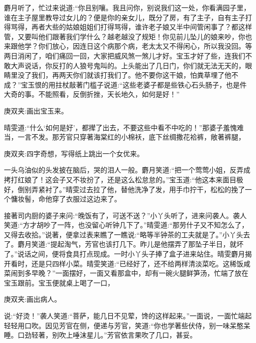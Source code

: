 \begin{parag}
麝月听了，忙过来说道:“你且别嚷。我且问你，别说我们这一处，你看满园子里，谁在主子屋里教导过女儿的？便是你的亲女儿，既分了房，有了主子，自有主子打得骂得，再者大些的姑娘姐姐们打得骂得，谁许老子娘又半中间管闲事了？都这样管，又要叫他们跟著我们学什么？越老越没了规矩！你见前儿坠儿的娘来吵，你也来跟他学？你们放心，因连日这个病那个病，老太太又不得闲心，所以我没回。等两日消闲了，咱们痛回一回，大家把威风煞一煞儿才好。宝玉才好了些，连我们不敢大声说话，你反打的人狼号鬼叫的。上头能出了几日门，你们就无法无天的，眼睛里没了我们，再两天你们就该打我们了。他不要你这干娘，怕粪草埋了他不成？”宝玉恨的用拄杖敲著门槛子说道:“这些老婆子都是些铁心石头肠子，也是件大奇的事。不能照看，反倒折挫，天长地久，如何是好！”\begin{note}庚双夹:画出宝玉来。\end{note}晴雯道:“什么‘如何是好’，都撵了出去，不要这些中看不中吃的！”那婆子羞愧难当，一言不发。那芳官只穿著海棠红的小棉袄，底下丝绸撒花袷裤，敞著裤腿，\begin{note}庚双夹:四字奇想，写得纸上跳出一个女优来。\end{note}一头乌油似的头发披在脑后，哭的泪人一般。麝月笑道:“把一个莺莺小姐，反弄成拷打红娘了！这会子又不妆扮了，还是这么松怠怠的。”宝玉道:“他这本来面目极好，倒别弄紧衬了。”晴雯过去拉了他，替他洗净了发，用手巾拧干，松松的挽了一个慵妆髻，命他穿了衣服过这边来了。
\end{parag}


\begin{parag}
    接著司内厨的婆子来问:“晚饭有了，可送不送？”小丫头听了，进来问袭人。袭人笑道:“方才胡吵了一阵，也没留心听钟几下了。”晴雯道:“那劳什子又不知怎么了，又得去收拾。”说著，便拿过表来瞧了一瞧说:“略等半钟茶的工夫就是了。”小丫头去了。麝月笑道:“提起淘气，芳官也该打几下。昨儿是他摆弄了那坠子半日，就坏了。”说话之间，便将食具打点现成。一时小丫头子捧了盒子进来站住。晴雯麝月揭开看时，还是只四样小菜。晴雯笑道:“已经好了，还不给两样清淡菜吃。这稀饭咸菜闹到多早晚？”一面摆好，一面又看那盒中，却有一碗火腿鲜笋汤，忙端了放在宝玉跟前。宝玉便就桌上喝了一口，\begin{note}庚双夹:画出病人。\end{note}说:“好烫！”袭人笑道:“菩萨，能几日不见荤，馋的这样起来。”一面说，一面忙端起轻轻用口吹。因见芳官在侧，便递与芳官，笑道:“你也学著些伏侍，别一味呆憨呆睡。口劲轻著，别吹上唾沫星儿。”芳官依言果吹了几口，甚妥。
\end{parag}


